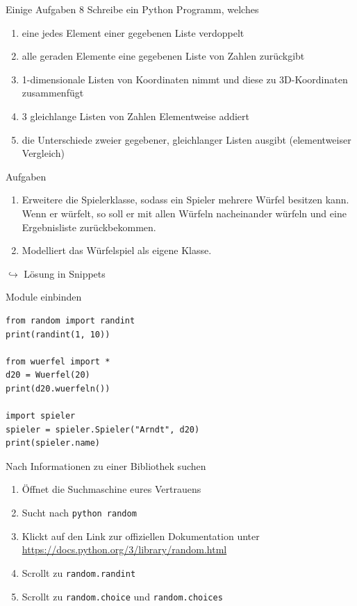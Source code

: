 \begin{frame}{Einige Aufgaben 8}
	Schreibe ein Python Programm, welches
	\begin{enumerate}
		\item eine jedes Element einer gegebenen Liste verdoppelt
		\item alle geraden Elemente eine gegebenen Liste von Zahlen zurückgibt
		\item 1-dimensionale Listen von Koordinaten nimmt und diese zu 3D-Koordinaten zusammenfügt
		\item 3 gleichlange Listen von Zahlen Elementweise addiert
		\item die Unterschiede zweier gegebener, gleichlanger Listen ausgibt (elementweiser Vergleich)
	\end{enumerate}
\end{frame}

\begin{frame}{Aufgaben}
	\begin{enumerate}
		\item Erweitere die Spielerklasse, sodass ein Spieler mehrere Würfel besitzen kann. Wenn er würfelt, so soll er mit allen Würfeln nacheinander würfeln und eine Ergebnisliste zurückbekommen.
		\item Modelliert das Würfelspiel als eigene Klasse.
	\end{enumerate}
	$\hookrightarrow$ Lösung in Snippets
\end{frame}

\begin{frame}[fragile]{Module einbinden}
	\begin{lstlisting}
from random import randint
print(randint(1, 10))

from wuerfel import *
d20 = Wuerfel(20)
print(d20.wuerfeln())

import spieler
spieler = spieler.Spieler("Arndt", d20)
print(spieler.name)
	\end{lstlisting}
\end{frame}

\begin{frame}{Nach Informationen zu einer Bibliothek suchen}
	\begin{enumerate}
		\item Öffnet die Suchmaschine eures Vertrauens
		\item Sucht nach \texttt{python random}
		\item Klickt auf den Link zur offiziellen Dokumentation unter \url{https://docs.python.org/3/library/random.html}
		\item Scrollt zu \texttt{random.randint}
		\item Scrollt zu \texttt{random.choice} und \texttt{random.choices}
	\end{enumerate}
\end{frame}

